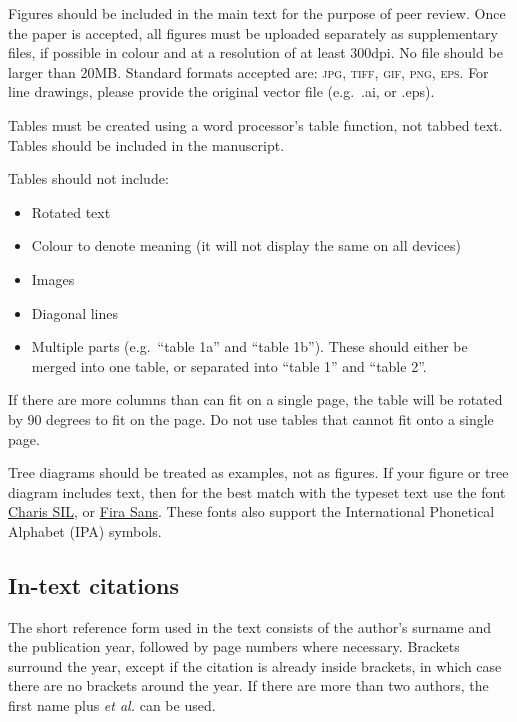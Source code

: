 \documentclass[cm,linguex]{glossa}
\begin{document}
Figures should be included in the main text for the purpose of peer
review. Once the paper is accepted, all figures must be uploaded
separately as supplementary files, if possible in colour and at a
resolution of at least 300dpi. No file should be larger than 20MB.
Standard formats accepted are: \textsc{jpg, tiff, gif, png, eps}. For
line drawings, please provide the original vector file (e.g.~.ai, or
.eps).

Tables must be created using a word processor's table function, not
tabbed text. Tables should be included in the manuscript.

Tables should not include:

\begin{itemize}
\item
  Rotated text
\item
  Colour to denote meaning (it will not display the same on all devices)
\item
  Images
\item
  Diagonal lines
\item
  Multiple parts (e.g.~``table 1a'' and ``table 1b''). These should
  either be merged into one table, or separated into ``table 1'' and
  ``table 2''.
\end{itemize}

If there are more columns than can fit on a single page, the table will
be rotated by 90 degrees to fit on the page. Do not use tables that
cannot fit onto a single page.

Tree diagrams should be treated as examples, not as figures. If your
figure or tree diagram includes text, then for the best match with the
typeset text use the font
\href{https://software.sil.org/charis/download/}{Charis SIL}, or
\href{https://www.fontsquirrel.com/fonts/fira-sans}{Fira Sans}. These
fonts also support the International Phonetical Alphabet (IPA) symbols.

\hypertarget{in-text-citations}{%
\subsection{In-text citations}\label{in-text-citations}}

The short reference form used in the text consists of the author's
surname and the publication year, followed by page numbers where
necessary. Brackets surround the year, except if the citation is already
inside brackets, in which case there are no brackets around the year. If
there are more than two authors, the first name plus \emph{et al.} can
be used.
\end{document}
